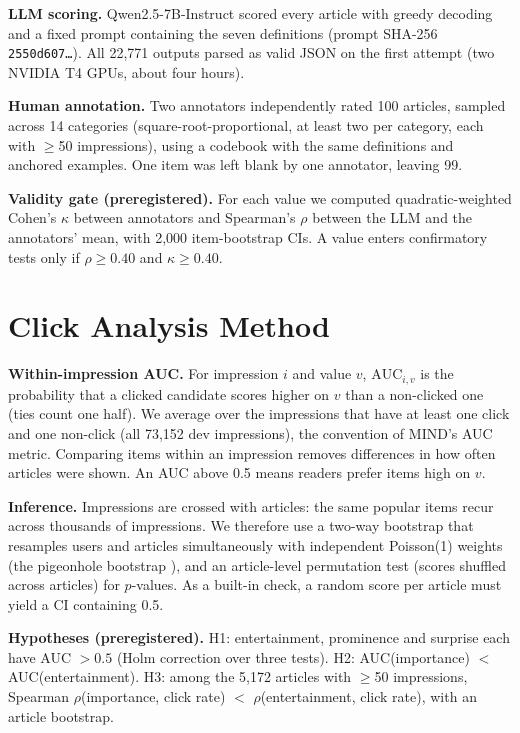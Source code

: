 \textbf{LLM scoring.} Qwen2.5-7B-Instruct \cite{qwen2025} scored every article with greedy decoding and a fixed prompt containing the seven definitions (prompt SHA-256 \texttt{2550d607\ldots}). All 22,771 outputs parsed as valid JSON on the first attempt (two NVIDIA T4 GPUs, about four hours).

\textbf{Human annotation.} Two annotators independently rated 100 articles, sampled across 14 categories (square-root-proportional, at least two per category, each with $\ge$50 impressions), using a codebook with the same definitions and anchored examples. One item was left blank by one annotator, leaving 99.

\textbf{Validity gate (preregistered).} For each value we computed quadratic-weighted Cohen's $\kappa$ \cite{cohen1968} between annotators and Spearman's $\rho$ between the LLM and the annotators' mean, with 2,000 item-bootstrap CIs. A value enters confirmatory tests only if $\rho \ge 0.40$ and $\kappa \ge 0.40$.

\section{Click Analysis Method}
\textbf{Within-impression AUC.} For impression $i$ and value $v$, $\mathrm{AUC}_{i,v}$ is the probability that a clicked candidate scores higher on $v$ than a non-clicked one (ties count one half). We average over the impressions that have at least one click and one non-click (all 73,152 dev impressions), the convention of MIND's AUC metric. Comparing items within an impression removes differences in how often articles were shown. An AUC above 0.5 means readers prefer items high on $v$.

\textbf{Inference.} Impressions are crossed with articles: the same popular items recur across thousands of impressions. We therefore use a two-way bootstrap that resamples users and articles simultaneously with independent Poisson(1) weights (the pigeonhole bootstrap \cite{owen2007,owen2012}), and an article-level permutation test (scores shuffled across articles) for $p$-values. As a built-in check, a random score per article must yield a CI containing 0.5.

\textbf{Hypotheses (preregistered).} H1: entertainment, prominence and surprise each have AUC $>0.5$ (Holm correction over three tests). H2: AUC(importance) $<$ AUC(entertainment). H3: among the 5,172 articles with $\ge$50 impressions, Spearman $\rho$(importance, click rate) $<$ $\rho$(entertainment, click rate), with an article bootstrap.

